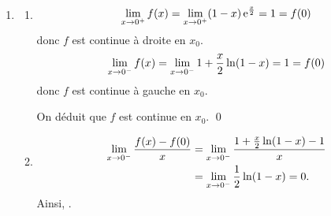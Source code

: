 \begin{description}
\begin{enumerate}
\begin{enumerate}
									On a alors le tableau de variation de $g$ : 
						\item {}
								Un examen du tableau de variation montre que $g(x)>0$ pour tout $x\in]-\infty;0[$.
					\end{enumerate}
				\item 
					\begin{enumerate}
						\item {}
							\vspace{-1\baselineskip}
							\begin{align*}
								\displaystyle \lim_{x\rightarrow 0^+} f(x) = \displaystyle \lim_{x\rightarrow 0^+} (1-x) \, \mathrm{e}^{\frac{x}{2}} = 1 = f(0)
							\end{align*}
								donc $f$ est continue \`a droite en $x_0$.
							\begin{align*}
								\displaystyle \lim_{x\rightarrow 0^-} f(x) = \displaystyle \lim_{x\rightarrow 0^-} 1 + \frac{x}{2} \ln (1-x) = 1 = f(0)
							\end{align*}
								donc $f$ est continue \`a gauche en $x_0$.
							
							On d\'eduit que $f$ est continue en $x_0$. \qed
						\item {}
							\vspace{-1\baselineskip}
								\begin{align*}
									\displaystyle \lim_{x\rightarrow 0^-} \frac{f(x) - f(0)}{x}
										&= \displaystyle \lim_{x\rightarrow 0^-}
										   \frac{1 + \frac{x}{2}\ln(1-x) - 1}{x}\\
										&= \displaystyle \lim_{x\rightarrow 0^-}\frac{1}{2}\ln(1-x)
										 = 0.
							\end{align*}
							Ainsi, .
					\end{enumerate}
			\end{enumerate}
	\end{description}
































